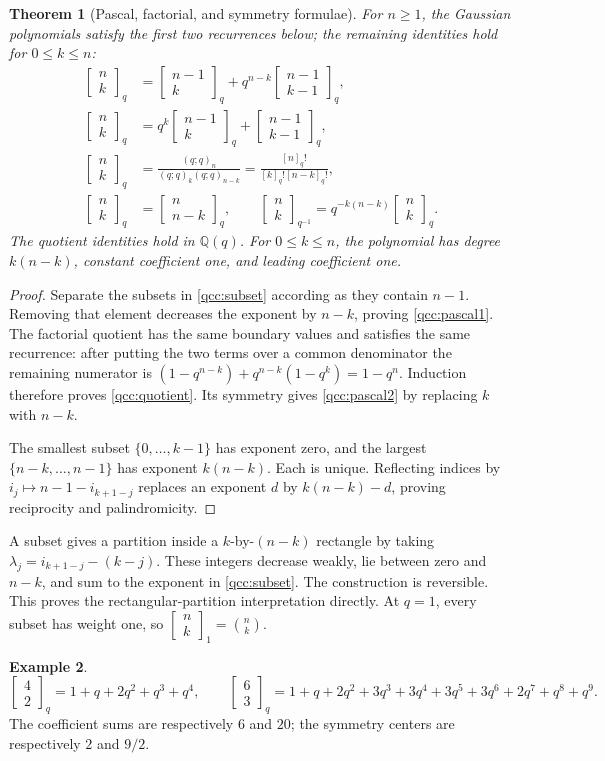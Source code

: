\documentclass[11pt,a4paper,oneside,openany]{book}
\newtheorem{theorem}{Theorem}[chapter]
\theoremstyle{definition}
\newtheorem{example}[theorem]{Example}
\theoremstyle{remark}
\newcommand{\Q}{\mathbb Q}
\newcommand{\GB}[3][q]{\begin{bmatrix}#2\\#3\end{bmatrix}_{#1}}
\newcommand{\qf}[2][q]{[#2]_{#1}!}
\begin{document}
\begin{theorem}[Pascal, factorial, and symmetry formulae]\label{qcc:pascal}
For \(n\ge1\), the Gaussian polynomials satisfy the first two recurrences
below; the remaining identities hold for \(0\le k\le n\):
\begin{align}
 \GB nk&=\GB{n-1}k+q^{n-k}\GB{n-1}{k-1},\label{qcc:pascal1}\\
 \GB nk&=q^k\GB{n-1}k+\GB{n-1}{k-1},\label{qcc:pascal2}\\
 \GB nk&=\frac{(q;q)_n}{(q;q)_k(q;q)_{n-k}}
       =\frac{\qf n}{\qf k\qf{n-k}},\label{qcc:quotient}\\
 \GB nk&=\GB n{n-k},\qquad
 \GB[q^{-1}]nk=q^{-k(n-k)}\GB nk.\label{qcc:reciprocity}
\end{align}
The quotient identities hold in \(\Q(q)\). For \(0\le k\le n\), the polynomial
has degree \(k(n-k)\), constant coefficient one, and leading coefficient one.
\end{theorem}
\begin{proof}
Separate the subsets in \eqref{qcc:subset} according as they contain \(n-1\).
Removing that element decreases the exponent by \(n-k\), proving
\eqref{qcc:pascal1}. The factorial quotient has the same boundary values and
satisfies the same recurrence: after putting the two terms over a common
denominator the remaining numerator is
\((1-q^{n-k})+q^{n-k}(1-q^k)=1-q^n\).
Induction therefore proves \eqref{qcc:quotient}. Its symmetry gives
\eqref{qcc:pascal2} by replacing \(k\) with \(n-k\).

The smallest subset \(\{0,\ldots,k-1\}\) has exponent zero, and the largest
\(\{n-k,\ldots,n-1\}\) has exponent \(k(n-k)\). Each is unique.
Reflecting indices by \(i_j\mapsto n-1-i_{k+1-j}\) replaces an exponent \(d\)
by \(k(n-k)-d\), proving reciprocity and palindromicity.
\end{proof}

A subset gives a partition inside a \(k\)-by-\((n-k)\) rectangle by taking
\(\lambda_j=i_{k+1-j}-(k-j)\). These integers decrease weakly, lie between
zero and \(n-k\), and sum to the exponent in \eqref{qcc:subset}. The construction
is reversible. This proves the rectangular-partition interpretation directly.
At \(q=1\), every subset has weight one, so \(\GB[1]nk=\binom nk\).

\begin{example}
\[
 \GB42=1+q+2q^2+q^3+q^4,\qquad
 \GB63=1+q+2q^2+3q^3+3q^4+3q^5+3q^6+2q^7+q^8+q^9.
\]
The coefficient sums are respectively \(6\) and \(20\); the symmetry centers
are respectively \(2\) and \(9/2\).
\end{example}
\end{document}
